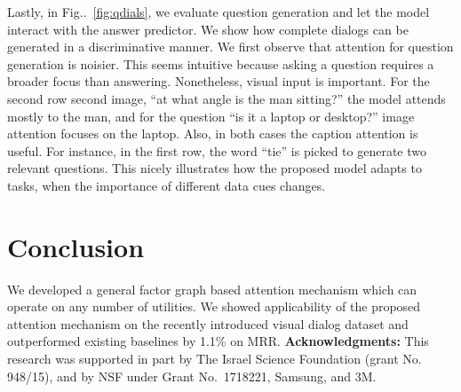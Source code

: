 \documentclass[10pt,twocolumn,letterpaper]{article}
\makeatletter
\def\@onedot{\ifx\@let@token.\else.\null\fi\xspace}
\DeclareRobustCommand\onedot{\futurelet\@let@token\@onedot}
\newcommand{\figref}[1]{Fig\onedot~\ref{#1}}
\makeatother
\begin{document}
Lastly, in \figref{fig:qdials}, we evaluate  question generation and let the model interact with the answer predictor.  We show how  complete dialogs can be generated in a discriminative manner. We first observe that attention for question generation  is noisier. This seems intuitive because asking  a question requires a broader focus than answering. 
Nonetheless, visual input is important. For the second row second image, ``at what angle is the man sitting?'' the model attends mostly to the man, and for the question ``is it a laptop or desktop?''  image attention focuses on the laptop. Also, in both cases the caption attention is useful. For instance, in the first row, the word ``tie'' is picked to generate two relevant questions. This nicely illustrates how the proposed model adapts to  tasks, when the importance of different data cues changes. 






 

\section{Conclusion}
\label{sec:conc}
\vspace{-0.2cm}
We developed a general factor graph based attention mechanism which can operate on any number of utilities. We showed applicability of the proposed attention mechanism  on the recently introduced visual dialog dataset and outperformed existing baselines by 1.1\% on MRR. 
\noindent\textbf{Acknowledgments:} This research was supported in part by The Israel Science Foundation (grant
No. 948/15), and by NSF under
Grant No.\ 1718221, Samsung, and 3M.  

{\small
	
	
}
\end{document}
